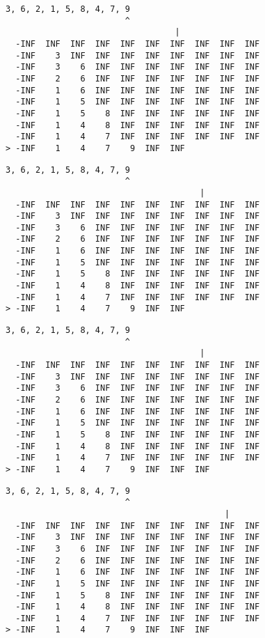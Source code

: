 { \begin{verbatim}
3, 6, 2, 1, 5, 8, 4, 7, 9
                        ^
                                  |
  -INF  INF  INF  INF  INF  INF  INF  INF  INF  INF
  -INF    3  INF  INF  INF  INF  INF  INF  INF  INF
  -INF    3    6  INF  INF  INF  INF  INF  INF  INF
  -INF    2    6  INF  INF  INF  INF  INF  INF  INF
  -INF    1    6  INF  INF  INF  INF  INF  INF  INF
  -INF    1    5  INF  INF  INF  INF  INF  INF  INF
  -INF    1    5    8  INF  INF  INF  INF  INF  INF
  -INF    1    4    8  INF  INF  INF  INF  INF  INF
  -INF    1    4    7  INF  INF  INF  INF  INF  INF
> -INF    1    4    7    9  INF  INF               
\end{verbatim} }

{ \begin{verbatim}
3, 6, 2, 1, 5, 8, 4, 7, 9
                        ^
                                       |
  -INF  INF  INF  INF  INF  INF  INF  INF  INF  INF
  -INF    3  INF  INF  INF  INF  INF  INF  INF  INF
  -INF    3    6  INF  INF  INF  INF  INF  INF  INF
  -INF    2    6  INF  INF  INF  INF  INF  INF  INF
  -INF    1    6  INF  INF  INF  INF  INF  INF  INF
  -INF    1    5  INF  INF  INF  INF  INF  INF  INF
  -INF    1    5    8  INF  INF  INF  INF  INF  INF
  -INF    1    4    8  INF  INF  INF  INF  INF  INF
  -INF    1    4    7  INF  INF  INF  INF  INF  INF
> -INF    1    4    7    9  INF  INF               
\end{verbatim} }

{ \begin{verbatim}
3, 6, 2, 1, 5, 8, 4, 7, 9
                        ^
                                       |
  -INF  INF  INF  INF  INF  INF  INF  INF  INF  INF
  -INF    3  INF  INF  INF  INF  INF  INF  INF  INF
  -INF    3    6  INF  INF  INF  INF  INF  INF  INF
  -INF    2    6  INF  INF  INF  INF  INF  INF  INF
  -INF    1    6  INF  INF  INF  INF  INF  INF  INF
  -INF    1    5  INF  INF  INF  INF  INF  INF  INF
  -INF    1    5    8  INF  INF  INF  INF  INF  INF
  -INF    1    4    8  INF  INF  INF  INF  INF  INF
  -INF    1    4    7  INF  INF  INF  INF  INF  INF
> -INF    1    4    7    9  INF  INF  INF          
\end{verbatim} }

{ \begin{verbatim}
3, 6, 2, 1, 5, 8, 4, 7, 9
                        ^
                                            |
  -INF  INF  INF  INF  INF  INF  INF  INF  INF  INF
  -INF    3  INF  INF  INF  INF  INF  INF  INF  INF
  -INF    3    6  INF  INF  INF  INF  INF  INF  INF
  -INF    2    6  INF  INF  INF  INF  INF  INF  INF
  -INF    1    6  INF  INF  INF  INF  INF  INF  INF
  -INF    1    5  INF  INF  INF  INF  INF  INF  INF
  -INF    1    5    8  INF  INF  INF  INF  INF  INF
  -INF    1    4    8  INF  INF  INF  INF  INF  INF
  -INF    1    4    7  INF  INF  INF  INF  INF  INF
> -INF    1    4    7    9  INF  INF  INF          
\end{verbatim} }

